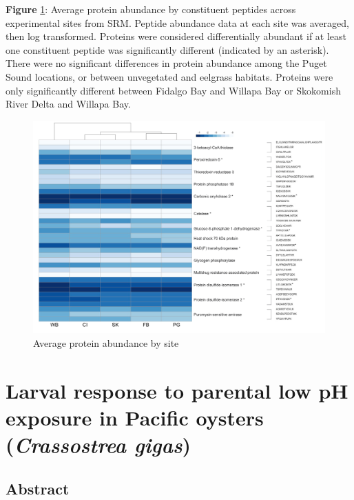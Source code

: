 \documentclass [11pt, proquest] {uwthesis}[2015/03/03]
\begin{document}
\textbf{Figure} \ref{fig:protheatmap}: Average protein abundance by constituent peptides across experimental sites from SRM. Peptide abundance data at each site was averaged, then log transformed. Proteins were considered differentially abundant if at least one constituent peptide was significantly different (indicated by an asterisk). There were no significant differences in protein abundance among the Puget Sound locations, or between unvegetated and eelgrass habitats. Proteins were only significantly different between Fidalgo Bay and Willapa Bay or Skokomish River Delta and Willapa Bay.\newline
\begin{figure}[h]
\centering
  \includegraphics[width=1\textwidth]{figure/Ch1/fig1.4.png}
  \caption{Average protein abundance by site}
  \label{fig:protheatmap}
\end{figure}
\hypertarget{larval-response-to-parental-low-ph-exposure-in-pacific-oysters-crassostrea-gigas}{%
\chapter{\texorpdfstring{Larval response to parental low pH exposure in Pacific oysters (\emph{Crassostrea gigas})}{Larval response to parental low pH exposure in Pacific oysters (Crassostrea gigas)}}\label{larval-response-to-parental-low-ph-exposure-in-pacific-oysters-crassostrea-gigas}}

\hypertarget{abstract-1}{%
\section{Abstract}\label{abstract-1}}
\end{document}
